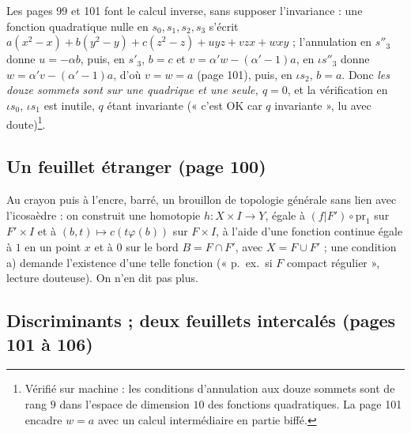 \documentclass[11pt,a4paper]{article}
\begin{document}
Les pages 99 et 101 font le calcul inverse, sans supposer l'invariance : une
fonction quadratique nulle en $s_0, s_1, s_2, s_3$ s'écrit $a(x^2 - x) + b(y^2 -
y) + c(z^2 - z) + uyz + vzx + wxy$ ; l'annulation en $s''_3$ donne $u = -\alpha
b$, puis, en $s'_3$, $b = c$ et $v = \alpha' w - (\alpha' - 1)a$, en $\iota s''_3$
donne $w = \alpha' v - (\alpha' - 1)a$, d'où $v = w = a$ (page 101), puis, en
$\iota s_2$, $b = a$. Donc \emph{les douze sommets sont sur une quadrique et une
seule, $q = 0$}, et la vérification en $\iota s_0$, $\iota s_1$ est inutile, $q$ étant invariante (« c'est OK car $q$ invariante », lu avec doute)\footnote{Vérifié sur machine : les
conditions d'annulation aux douze sommets sont de rang $9$ dans l'espace de
dimension $10$ des fonctions quadratiques. La page 101 encadre $w = a$ avec un
calcul intermédiaire en partie biffé.}.

\subsection*{Un feuillet étranger (page 100)}

Au crayon puis à l'encre, barré, un brouillon de topologie générale sans lien
avec l'icosaèdre : on construit une homotopie $h : X \times I \to Y$, égale à
$(f|F') \circ \mathrm{pr}_1$ sur $F' \times I$ et à $(b, t) \mapsto
c(t\varphi(b))$ sur $F \times I$, à l'aide d'une fonction continue égale à $1$
en un point $x$ et à $0$ sur le bord $B = F \cap F'$, avec $X = F \cup F'$ ;
une condition a) demande l'existence d'une telle fonction (« p.\ ex.\ si $F$
compact régulier », lecture douteuse). On n'en dit pas plus.

\subsection*{Discriminants ; deux feuillets intercalés (pages 101 à 106)}
\end{document}
